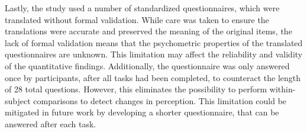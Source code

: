 Lastly, the study used a number of standardized questionnaires, which were translated without formal validation. While care was taken to ensure the translations were accurate and preserved the meaning of the original items, the lack of formal validation means that the psychometric properties of the translated questionnaires are unknown. This limitation may affect the reliability and validity of the quantitative findings. Additionally, the questionnaire was only answered once by participants, after all tasks had been completed, to counteract the length of 28 total questions. However, this eliminates the possibility to perform within-subject comparisons to detect changes in perception. This limitation could be mitigated in future work by developing a shorter questionnaire, that can be answered after each task.
